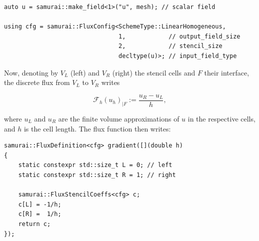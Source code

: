 \begin{listing}[ht]
\begin{verbatim}
auto u = samurai::make_field<1>("u", mesh); // scalar field

using cfg = samurai::FluxConfig<SchemeType::LinearHomogeneous,
                                1,            // output_field_size
                                2,            // stencil_size
                                decltype(u)>; // input_field_type
\end{verbatim}
\end{listing}

Now, denoting by $V_L$ (left) and $V_R$ (right) the stencil cells and $F$ their interface, the discrete flux from $V_L$ to $V_R$ writes

\begin{equation*}
    \mathcal{F}_h(u_h)_{|F} := \frac{u_R-u_L}{h},
\end{equation*}

where $u_L$ and $u_R$ are the finite volume approximations of $u$ in the respective cells, and $h$ is the cell length.
The flux function then writes:

\begin{listing}[ht]
    \begin{verbatim}
samurai::FluxDefinition<cfg> gradient([](double h)
{
    static constexpr std::size_t L = 0; // left
    static constexpr std::size_t R = 1; // right

    samurai::FluxStencilCoeffs<cfg> c;
    c[L] = -1/h;
    c[R] =  1/h;
    return c;
});
\end{verbatim}
\end{listing}

